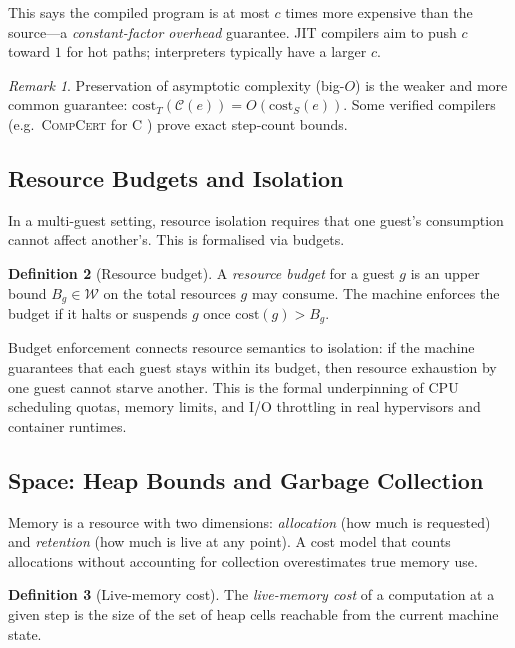 \documentclass[11pt, a4paper]{article}
\theoremstyle{definition}
\newtheorem{definition}{Definition}[section]
\theoremstyle{plain}
\theoremstyle{remark}
\newtheorem{remark}[definition]{Remark}
\begin{document}
This says the compiled program is at most $c$ times more expensive than the
source---a \emph{constant-factor overhead} guarantee. JIT compilers aim
to push $c$ toward $1$ for hot paths; interpreters typically have a larger
$c$.

\begin{remark}
  Preservation of asymptotic complexity (big-$O$) is the weaker and more
  common guarantee: $\mathrm{cost}_T(\mathcal{C}(e)) = O(\mathrm{cost}_S(e))$.
  Some verified compilers (e.g.\ \textsc{CompCert} for C \citep{leroy2009})
  prove exact step-count bounds.
\end{remark}

\subsection{Resource Budgets and Isolation}

In a multi-guest setting, resource isolation requires that one guest's
consumption cannot affect another's. This is formalised via budgets.

\begin{definition}[Resource budget]
  A \emph{resource budget} for a guest $g$ is an upper bound
  $B_g \in \mathcal{W}$ on the total resources $g$ may consume. The
  machine enforces the budget if it halts or suspends $g$ once
  $\mathrm{cost}(g) > B_g$.
\end{definition}

Budget enforcement connects resource semantics to isolation: if the machine
guarantees that each guest stays within its budget, then resource exhaustion
by one guest cannot starve another. This is the formal underpinning of CPU
scheduling quotas, memory limits, and I/O throttling in real hypervisors and
container runtimes.

\subsection{Space: Heap Bounds and Garbage Collection}

Memory is a resource with two dimensions: \emph{allocation} (how much is
requested) and \emph{retention} (how much is live at any point). A cost
model that counts allocations without accounting for collection
overestimates true memory use.

\begin{definition}[Live-memory cost]
  The \emph{live-memory cost} of a computation at a given step is the size
  of the set of heap cells reachable from the current machine state.
\end{definition}
\end{document}

